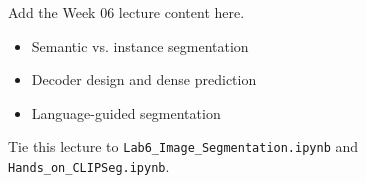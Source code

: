 Add the Week 06 lecture content here.

\begin{itemize}
  \item Semantic vs. instance segmentation
  \item Decoder design and dense prediction
  \item Language-guided segmentation
\end{itemize}

Tie this lecture to \texttt{Lab6\_Image\_Segmentation.ipynb} and \texttt{Hands\_on\_CLIPSeg.ipynb}.
